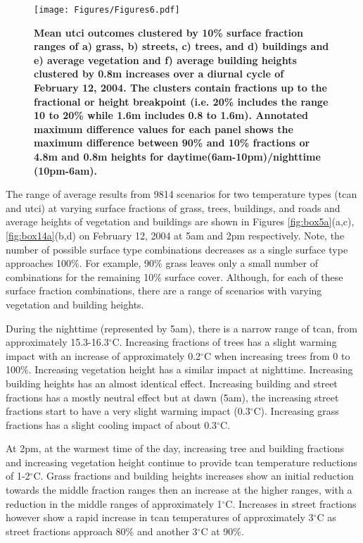 \documentclass[final,3p,times,authoryear]{elsarticle}
\begin{document}
\begin{figure}
\centering
\texttt{[image: Figures/Figures6.pdf]}
\caption{\bf Mean \gls{utci} outcomes clustered by 10\% surface fraction ranges of a) grass, b) streets, c) trees, and d) buildings and e) average vegetation and f) average building heights clustered by 0.8m increases over a diurnal cycle of February 12, 2004. The clusters contain fractions up to the fractional or height breakpoint (i.e. 20\% includes the range 10 to 20\%  while 1.6m includes 0.8 to 1.6m). Annotated maximum difference values for each panel shows the maximum difference between 90\% and 10\% fractions or 4.8m and 0.8m heights for daytime(6am-10pm)/nighttime (10pm-6am).}
 \label{fig:utciday}
\end{figure}


The range of average results from 9814 scenarios for two temperature types (\gls{tcan} and \gls{utci}) at varying surface fractions of grass, trees, buildings, and roads and average heights of vegetation and buildings are shown in Figures \ref{fig:box5a}(a,c), \ref{fig:box14a}(b,d) on February 12, 2004 at 5am and 2pm respectively. Note, the number of possible surface type combinations decreases as a single surface type approaches 100\%. For example, 90\% grass leaves only a small number of combinations for the remaining 10\% surface cover. Although, for each of these surface fraction combinations, there are a range of scenarios with varying vegetation and building heights.

During the nighttime (represented by 5am), there is a narrow range of \gls{tcan}, from approximately 15.3-16.3$^{\circ}$C. Increasing fractions of trees has a slight warming impact with an increase of approximately 0.2$^{\circ}$C when increasing trees from 0 to 100\%. Increasing vegetation height has a similar impact at nighttime. Increasing building heights has an almost identical effect. Increasing building and street fractions has a mostly neutral effect but at dawn (5am), the increasing street fractions start to have a very slight warming impact (0.3$^{\circ}$C). Increasing grass fractions has a slight cooling impact of about 0.3$^{\circ}$C.

At 2pm, at the warmest time of the day, increasing tree and building fractions and increasing vegetation height continue to provide \gls{tcan} temperature reductions of 1-2$^{\circ}$C. Grass fractions and building heights increases show an initial reduction towards the middle fraction ranges then an increase at the higher ranges, with a reduction in the middle ranges of approximately 1$^{\circ}$C. Increases in street fractions however show a rapid increase in \gls{tcan} temperatures of approximately 3$^{\circ}$C as street fractions approach 80\% and another 3$^{\circ}$C at 90\%.
\end{document}

